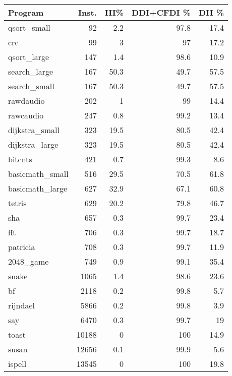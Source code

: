 \begin{tabular}{lrrrr}
\hline
 Program         &   Inst. &   III\% &   DDI+CFDI \% &   DII \% \\
\hline
 qsort\_small     &      92 &    2.2 &         97.8 &    17.4 \\
 crc             &      99 &    3   &         97   &    17.2 \\
 qsort\_large     &     147 &    1.4 &         98.6 &    10.9 \\
 search\_large    &     167 &   50.3 &         49.7 &    57.5 \\
 search\_small    &     167 &   50.3 &         49.7 &    57.5 \\
 rawdaudio       &     202 &    1   &         99   &    14.4 \\
 rawcaudio       &     247 &    0.8 &         99.2 &    13.4 \\
 dijkstra\_small  &     323 &   19.5 &         80.5 &    42.4 \\
 dijkstra\_large  &     323 &   19.5 &         80.5 &    42.4 \\
 bitcnts         &     421 &    0.7 &         99.3 &     8.6 \\
 basicmath\_small &     516 &   29.5 &         70.5 &    61.8 \\
 basicmath\_large &     627 &   32.9 &         67.1 &    60.8 \\
 tetris          &     629 &   20.2 &         79.8 &    46.7 \\
 sha             &     657 &    0.3 &         99.7 &    23.4 \\
 fft             &     706 &    0.3 &         99.7 &    18.7 \\
 patricia        &     708 &    0.3 &         99.7 &    11.9 \\
 2048\_game       &     749 &    0.9 &         99.1 &    35.4 \\
 snake           &    1065 &    1.4 &         98.6 &    23.6 \\
 bf              &    2118 &    0.2 &         99.8 &     5.7 \\
 rijndael        &    5866 &    0.2 &         99.8 &     3.9 \\
 say             &    6470 &    0.3 &         99.7 &    19   \\
 toast           &   10188 &    0   &        100   &    14.9 \\
 susan           &   12656 &    0.1 &         99.9 &     5.6 \\
 ispell          &   13545 &    0   &        100   &    19.8 \\

\end{tabular}
